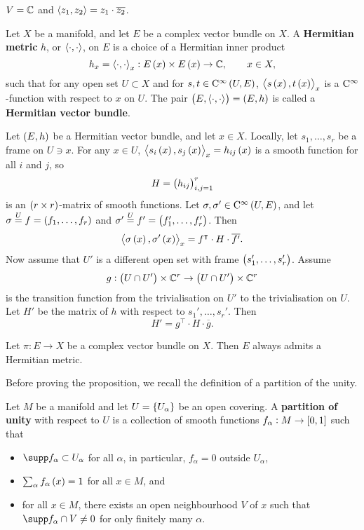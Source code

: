 \begin{example*}
$ V = \mathbb{C} $ and $ \left\langle z_1, z_2 \right\rangle = z_1 \cdot \overline{z_2} $.
\end{example*}

\begin{definition}
Let $ X $ be a manifold, and let $ E $ be a complex vector bundle on $ X $. A \textbf{Hermitian metric} $ h $, or $ \left\langle \cdot, \cdot \right\rangle $, on $ E $ is a choice of a Hermitian inner product
$$ h_x = \abr{\cdot, \cdot}_x : E\br{x} \times E\br{x} \to \CC, \qquad x \in X, $$
such that for any open set $ U \subset X $ and for $ s, t \in \C^\infty\br{U, E} $, $ \abr{s\br{x}, t\br{x}}_x $ is a $ \mathrm{C}^\infty $-function with respect to $ x $ on $ U $. The pair $ \br{E, \abr{\cdot, \cdot}} = \br{E, h} $ is called a \textbf{Hermitian vector bundle}.
\end{definition}

\pagebreak

Let $ \br{E, h} $ be a Hermitian vector bundle, and let $ x \in X $. Locally, let $ s_1, \dots, s_r $ be a frame on $ U \ni x $. For any $ x \in U $, $ \abr{s_i\br{x}, s_j\br{x}}_x = h_{ij}\br{x} $ is a smooth function for all $ i $ and $ j $, so
$$ H = \br{h_{ij}}_{i, j = 1}^r $$
is an $ \br{r \times r} $-matrix of smooth functions. Let $ \sigma, \sigma' \in \C^\infty\br{U, E} $, and let $ \sigma \overset{U}{=} f = \br{f_1, \dots, f_r} $ and $ \sigma' \overset{U}{=} f' = \br{f_1', \dots, f_r'} $. Then
$$ \abr{\sigma\br{x}, \sigma'\br{x}}_x = f^\intercal \cdot H \cdot \overline{f'}. $$
Now assume that $ U' $ is a different open set with frame $ \br{s_1', \dots, s_r'} $. Assume
$$ g : \br{U \cap U'} \times \CC^r \to \br{U \cap U'} \times \CC^r $$
is the transition function from the trivialisation on $ U' $ to the trivialisation on $ U $. Let $ H' $ be the matrix of $ h $ with respect to $ s_1', \dots, s_r' $. Then
$$ H' = g^\intercal \cdot H \cdot \overline{g}. $$

\begin{proposition}
Let $ \pi : E \to X $ be a complex vector bundle on $ X $. Then $ E $ always admits a Hermitian metric.
\end{proposition}

Before proving the proposition, we recall the definition of a partition of the unity.

\begin{definition}
Let $ M $ be a manifold and let $ U = \cbr{U_\alpha} $ be an open covering. A \textbf{partition of unity} with respect to $ U $ is a collection of smooth functions $ f_\alpha : M \to \sbr{0, 1} $ such that
\begin{itemize}
\item $ \supp f_\alpha \subset U_\alpha $ for all $ \alpha $, in particular, $ f_\alpha = 0 $ outside $ U_\alpha $,
\item $ \sum_\alpha f_\alpha\br{x} = 1 $ for all $ x \in M $, and
\item for all $ x \in M $, there exists an open neighbourhood $ V $ of $ x $ such that $ \supp f_\alpha \cap V \ne 0 $ for only finitely many $ \alpha $.
\end{itemize}
\end{definition}

